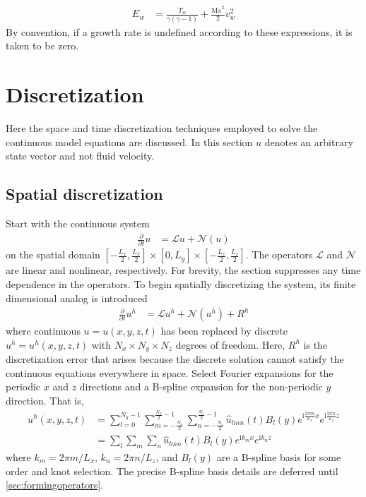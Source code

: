 \documentclass[letterpaper,11pt,nointlimits,reqno,draft]{amsbook}
\newcommand{\ii}{\ensuremath{\mathrm{i}}}
\newcommand{\Mach}[1][]{\ensuremath{\mbox{Ma}_{#1}}}
\begin{document}
%
\begin{align}
    E_w &= \frac{T_w}{\gamma\left(\gamma-1\right)} + \frac{\Mach^2}{2} v_w^2
\end{align}
By convention, if a growth rate is undefined according to these expressions, it
is taken to be zero.

\chapter{Discretization}
\label{sec:discretization}

Here the space and time discretization techniques employed to solve the
continuous model equations are discussed.  In this section $u$ denotes an
arbitrary state vector and not fluid velocity.

\section{Spatial discretization}
\label{sec:spatialdiscretization}

Start with the continuous system
\begin{align}
  \frac{\partial}{\partial{}t} u &= \mathscr{L}u + \mathscr{N}\!\left(u\right)
\end{align}
on the spatial domain $\left[-\frac{L_x}{2},\frac{L_x}{2}\right] \times{}
[0,L_y] \times{} \left[-\frac{L_z}{2},\frac{L_z}{2}\right]$.  The operators
$\mathscr{L}$ and $\mathscr{N}$ are linear and nonlinear, respectively.  For
brevity, the section suppresses any time dependence in the operators.  To begin
spatially discretizing the system, its finite dimensional analog is introduced
\begin{align}
  \frac{\partial}{\partial{}t} u^h
  &=
  \mathscr{L}u^h + \mathscr{N}\!\left(u^h\right) + R^h
  \label{eq:discrete_system_with_residual}
\end{align}
where continuous $u = u\!\left(x,y,z,t\right)$ has been replaced by discrete
$u^h = u^h\!\left(x,y,z,t\right)$ with $N_x\times{}N_y\times{}N_z$ degrees of
freedom.  Here, $R^h$ is the discretization error that arises because the
discrete solution cannot satisfy the continuous equations everywhere in space.
Select Fourier expansions for the periodic $x$ and $z$ directions and a
B-spline expansion for the non-periodic $y$ direction.  That is,
\begin{align}
u^h(x,y,z,t)
&=
  \sum_{l=0}^{N_y - 1}
  \sum_{m=-\frac{N_x}{2}}^{\frac{N_x}{2}-1}
  \sum_{n=-\frac{N_z}{2}}^{\frac{N_z}{2}-1}
  \hat{u}_{l m n}(t)
  B_l\!\left(y\right)
  e^{\ii\frac{2\pi{}m}{L_x}x}
  e^{\ii\frac{2\pi{}n}{L_z}z}
  \\
&=
  \sum_{l}\sum_{m}\sum_{n}
  \hat{u}_{l m n}(t)B_l\!\left(y\right)e^{\ii k_m x}e^{\ii k_n z}
  \label{eq:u_h_expansion}
\end{align}
where $k_m = 2\pi{}m/L_x$, $k_n = 2\pi{}n/L_z$, and $B_l\!\left(y\right)$ are a
B-spline basis for some order and knot selection.  The precise B-spline basis
details are deferred until \autoref{sec:formingoperators}.
\end{document}
